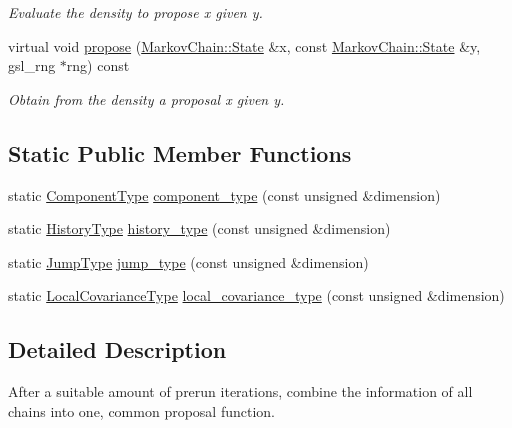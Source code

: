 \begin{DoxyCompactItemize}
\begin{DoxyCompactList}\small\item\em Evaluate the density to propose x given y. \item\end{DoxyCompactList}\item 
virtual void \hyperlink{classeos_1_1proposal__functions_1_1GlobalLocal_a600d45aa7174be9fb264a938de61a568}{propose} (\hyperlink{structeos_1_1MarkovChain_1_1State}{MarkovChain::State} \&x, const \hyperlink{structeos_1_1MarkovChain_1_1State}{MarkovChain::State} \&y, gsl\_\-rng $\ast$rng) const 
\begin{DoxyCompactList}\small\item\em Obtain from the density a proposal x given y. \item\end{DoxyCompactList}\end{DoxyCompactItemize}
\subsection*{Static Public Member Functions}
\begin{DoxyCompactItemize}
\item 
static \hyperlink{classeos_1_1hdf5_1_1Composite}{ComponentType} \hyperlink{classeos_1_1proposal__functions_1_1GlobalLocal_a26968f54a698fc8726f0a81c84bc6294}{component\_\-type} (const unsigned \&dimension)
\item 
static \hyperlink{classeos_1_1hdf5_1_1Composite}{HistoryType} \hyperlink{classeos_1_1proposal__functions_1_1GlobalLocal_af44478dfd75149c63937af4c6583fbdf}{history\_\-type} (const unsigned \&dimension)
\item 
static \hyperlink{classeos_1_1hdf5_1_1Composite}{JumpType} \hyperlink{classeos_1_1proposal__functions_1_1GlobalLocal_a0dc6c82443a5a7f091aced9f00e9e924}{jump\_\-type} (const unsigned \&dimension)
\item 
static \hyperlink{classeos_1_1hdf5_1_1Composite}{LocalCovarianceType} \hyperlink{classeos_1_1proposal__functions_1_1GlobalLocal_ab9e4e7b924b9cc58191abef0ec3ed007}{local\_\-covariance\_\-type} (const unsigned \&dimension)
\end{DoxyCompactItemize}


\subsection{Detailed Description}
After a suitable amount of prerun iterations, combine the information of all chains into one, common proposal function. 

